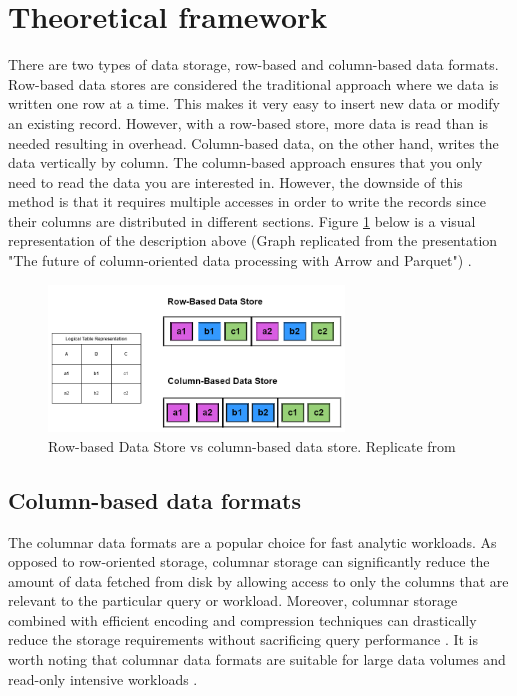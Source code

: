\section{Theoretical framework}
\label{sect:theoryframework}
There are two types of data storage, row-based and column-based data formats. Row-based data stores are considered the traditional approach where we data is written one row at a time. This makes it very easy to insert new data or modify an existing record. However, with a row-based store, more data is read than is needed resulting in overhead. Column-based data, on the other hand, writes the data vertically by column. The column-based approach ensures that you only need to read the data you are interested in. However, the downside of this method is that it requires multiple accesses in order to write the records since their columns are distributed in different sections. Figure \ref{fig:rowvscolumn} below is a visual representation of the description above (Graph replicated from the presentation "The future of column-oriented data processing with Arrow
and Parquet") \cite{jack_future_nodate, cao_data_2017}. 


\begin{figure}[!h]
  \centering
  \includegraphics[width=0.7\textwidth]{img/concept.png}
  \caption{Row-based Data Store vs column-based data store. Replicate from \cite{jack_future_nodate}}
  \label{fig:rowvscolumn}
\end{figure}

\subsection{Column-based data formats}

The columnar data formats are a popular choice for fast analytic workloads. As opposed to row-oriented storage, columnar storage can significantly reduce the amount of data fetched from disk by allowing access to only the columns that are relevant to the particular query or workload. Moreover, columnar storage combined with efficient encoding and compression techniques can drastically reduce the storage requirements without sacrificing query performance \cite{floratou2018columnar}. It is worth noting that columnar data formats are suitable for large data volumes and read-only intensive workloads \cite{jack_future_nodate, cao_data_2017}. 

